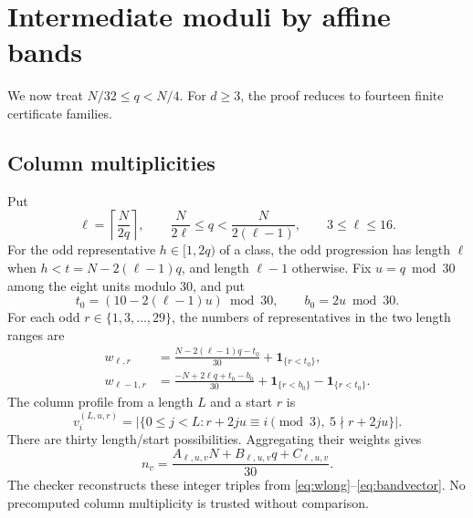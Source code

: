 \documentclass[11pt,a4paper]{article}
\theoremstyle{remark}
\newcommand{\one}{\mathbf 1}
\numberwithin{equation}{section}
\begin{document}
\section{Intermediate moduli by affine bands}\label{sec:bands}
We now treat \(N/32\le q<N/4\).
For \(d\ge3\), the proof reduces to fourteen finite certificate families.

\subsection{Column multiplicities}
Put
\[
 \ell=\left\lceil\frac{N}{2q}\right\rceil,\qquad
 \frac{N}{2\ell}\le q<\frac{N}{2(\ell-1)},\qquad 3\le\ell\le16.
\]
For the odd representative \(h\in[1,2q)\) of a class, the odd
progression has length \(\ell\) when
\(h<t=N-2(\ell-1)q\), and length \(\ell-1\) otherwise.
Fix \(u=q\bmod30\) among the eight units modulo \(30\), and put
\[
 t_0=(10-2(\ell-1)u)\bmod30,\qquad b_0=2u\bmod30.
\]
For each odd \(r\in\{1,3,\ldots,29\}\), the numbers of representatives
in the two length ranges are
\begin{align}
 w_{\ell,r}
   &=\frac{N-2(\ell-1)q-t_0}{30}+\one_{\{r<t_0\}},\label{eq:wlong}\\
 w_{\ell-1,r}
   &=\frac{-N+2\ell q+t_0-b_0}{30}
             +\one_{\{r<b_0\}}-\one_{\{r<t_0\}}.\label{eq:wshort}
\end{align}
The column profile from a length \(L\) and a start \(r\) is
\begin{equation}\label{eq:bandvector}
 v_i^{(L,u,r)}
 =|\{0\le j<L:r+2ju\equiv i\pmod3,\ 5\nmid r+2ju\}|.
\end{equation}
There are thirty length/start possibilities.
Aggregating their weights gives
\begin{equation}\label{eq:affine}
 n_v=\frac{A_{\ell,u,v}N+B_{\ell,u,v}q+C_{\ell,u,v}}{30}.
\end{equation}
The checker reconstructs these integer triples from
\eqref{eq:wlong}--\eqref{eq:bandvector}. No precomputed column
multiplicity is trusted without comparison.
\end{document}
